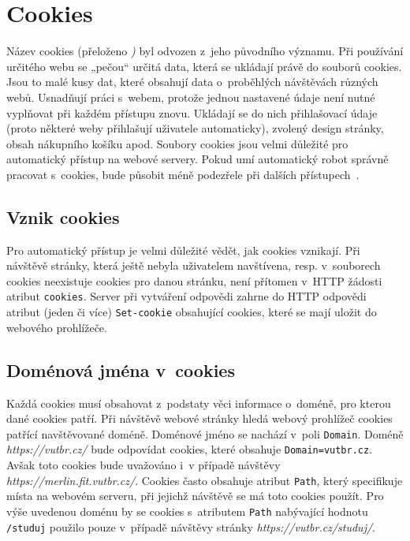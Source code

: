 \section{Cookies}
\label{sec:cookies}
Název cookies (přeloženo \textit{)} byl odvozen z~jeho původního významu. Při používání určitého webu se „pečou“ určitá data, která se ukládají právě do souborů cookies. Jsou to malé kusy dat, které obsahují data o~proběhlých návštěvách různých webů. Usnadňují práci s~webem, protože jednou nastavené údaje není nutné vyplňovat při každém přístupu znovu. Ukládají se do nich přihlašovací údaje (proto některé weby přihlašují uživatele automaticky), zvolený design stránky, obsah nákupního košíku apod.
Soubory cookies jsou velmi důležité pro automatický přístup na webové servery. Pokud umí automatický robot správně pracovat s~cookies, bude působit méně podezřele při dalších přístupech~\cite{bib:developerMozilla}.

\subsection*{Vznik cookies}
Pro automatický přístup je velmi důležité vědět, jak cookies vznikají. Při návštěvě stránky, která ještě nebyla uživatelem navštívena, resp. v~souborech cookies neexistuje cookies pro danou stránku, není přítomen v~HTTP žádosti atribut \texttt{cookies}. Server při vytváření odpovědi zahrne do HTTP odpovědi atribut (jeden či více) \texttt{Set-cookie} obsahující cookies, které se mají uložit do webového prohlížeče.

\subsection*{Doménová jména v~cookies}
Každá cookies musí obsahovat z~podstaty věci informace o~doméně, pro kterou dané cookies patří. Při návštěvě webové stránky hledá webový prohlížeč cookies patřící navštěvované doméně. Doménové jméno se nachází v~poli \texttt{Domain}. Doméně \textit{https://vutbr.cz/} bude odpovídat cookies, které obsahuje \texttt{Domain=vutbr.cz}. Avšak toto cookies bude uvažováno i~v případě návštěvy \textit{https://merlin.fit.vutbr.cz/}. Cookies často obsahuje atribut \texttt{Path}, který specifikuje místa na webovém serveru, při jejichž návštěvě se má toto cookies použít. Pro výše uvedenou doménu by se cookies s~atributem \texttt{Path} nabývající hodnotu \texttt{/studuj} použilo pouze v~případě návštěvy stránky \textit{https://vutbr.cz/studuj/}.

